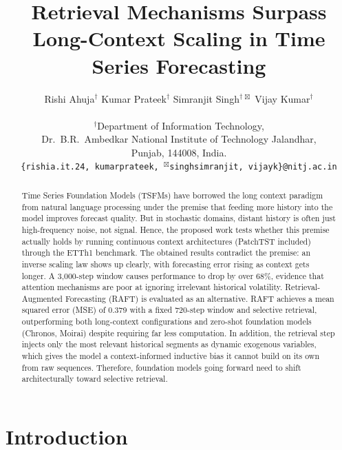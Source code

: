 \documentclass{article} %
\title{Retrieval Mechanisms Surpass Long-Context Scaling in Time Series Forecasting}
\author{Rishi Ahuja$^{\dagger}$ \hspace{1.5em} Kumar Prateek$^{\dagger}$ \hspace{1.5em} Simranjit Singh$^{\dagger\,\boxtimes}$ \hspace{1.5em} Vijay Kumar$^{\dagger}$ \\
\\
$^{\dagger}$Department of Information Technology, \\
\hspace{4}Dr.\ B.R.\ Ambedkar National Institute of Technology Jalandhar, \\
\hspace{4}Punjab, 144008, India. \\ 
\hspace{3}\texttt{\{rishia.it.24, kumarprateek, $^{\boxtimes}$singhsimranjit, vijayk\}@nitj.ac.in}
}
\begin{document}
\maketitle
{
  \renewcommand{\thefootnote}{}
}

\begin{abstract}
Time Series Foundation Models (TSFMs) have borrowed the long context paradigm from natural language processing under the premise that feeding more history into the model improves forecast quality. But in stochastic domains, distant history is often just high-frequency noise, not signal. Hence, the proposed work tests whether this premise actually holds by running continuous context architectures (PatchTST included) through the ETTh1 benchmark. The obtained results contradict the premise: an inverse scaling law shows up clearly, with forecasting error rising as context gets longer. A 3,000-step window causes performance to drop by over 68\%, evidence that attention mechanisms are poor at ignoring irrelevant historical volatility. Retrieval-Augmented Forecasting (RAFT) is evaluated as an alternative. RAFT achieves a mean squared error (MSE) of 0.379 with a fixed 720-step window and selective retrieval, outperforming both long-context configurations and zero-shot foundation models (Chronos, Moirai) despite requiring far less computation. In addition, the retrieval step injects only the most relevant historical segments as dynamic exogenous variables, which gives the model a context-informed inductive bias it cannot build on its own from raw sequences. Therefore, foundation models going forward need to shift architecturally toward selective retrieval.
\end{abstract}

\section{Introduction}
\end{document}
